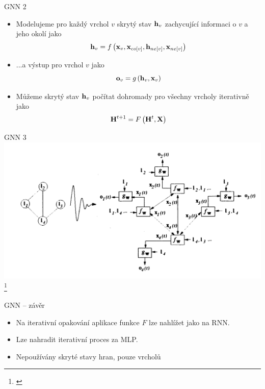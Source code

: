 \documentclass[10pt]{beamer}
\newcommand{\mathvec}{\ensuremath{\mathbf}}
\newcommand{\mathmat}{\ensuremath{\mathbf}}
\begin{document}
\begin{frame}{GNN 2}
	\begin{itemize}
		\item Modelujeme pro každý vrchol \( v \) skrytý stav \( \mathvec{h}_v \) zachycující informaci o \( v \) a jeho okolí jako
			\[ \mathvec{h}_v = f \left( \mathvec{x}_v, \mathvec{x}_{co \left[ v \right]}, \mathvec{h}_{ne \left[ v \right]}, \mathvec{x}_{ne \left[ v \right]} \right) \]
		\item ...a výstup pro vrchol \( v \) jako
			\[ \mathvec{o}_v = g \left( \mathvec{h}_v, \mathvec{x}_v \right) \]
		\item Můžeme skrytý stav \( \mathvec{h}_v \) počítat dohromady pro všechny vrcholy iterativně jako
			\[ \mathmat{H}^{t + 1} = F \left( \mathmat{H}^t, \mathmat{X} \right) \]
	\end{itemize}
\end{frame}

\begin{frame}{GNN 3}
	\centering
	\includegraphics[width=0.9\pagewidth]{images/GNN.png}\footnote{\cite{gori_new_2005}}
\end{frame}

\begin{frame}{GNN -- závěr}
	\begin{itemize}
		\item Na iterativní opakování aplikace funkce \( F \) lze nahlížet jako na RNN.
		\item Lze nahradit iterativní proces za MLP.
		\item Nepoužívány skryté stavy hran, pouze vrcholů
	\end{itemize}
\end{frame}
\end{document}
